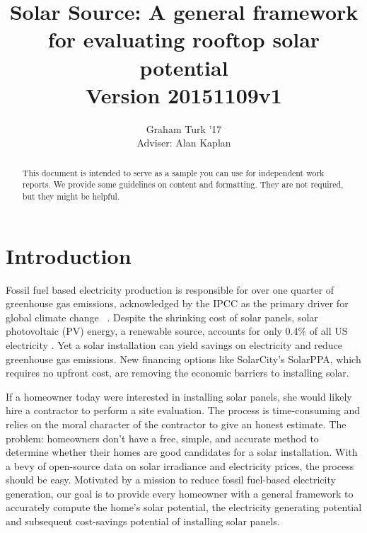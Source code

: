 \documentclass[pageno]{jpaper}
\begin{document}
\title{
Solar Source: A general framework for evaluating rooftop solar potential\\
Version 20151109v1}

\author{Graham Turk '17\\Adviser: Alan Kaplan}

\date{}
\maketitle

\thispagestyle{empty}
\doublespacing
\begin{abstract}
This document is intended to serve as a sample you can use for independent work reports.  We provide some guidelines on content and formatting.  They are not required, but they might be helpful.
\end{abstract}


\section{Introduction}  
Fossil fuel based electricity production is responsible for over one quarter of greenhouse gas emissions, acknowledged by the IPCC as the primary driver for global climate change ~\cite{IPCC}. Despite the shrinking cost of solar panels, solar photovoltaic (PV) energy, a renewable source, accounts for only 0.4\% of all US electricity \cite{USEIA}. Yet a solar installation can yield savings on electricity and reduce greenhouse gas emissions. New financing options like SolarCity's SolarPPA, which requires no upfront cost, are removing the economic barriers to installing solar.

If a homeowner today were interested in installing solar panels, she would likely hire a contractor to perform a site evaluation. The process is time-consuming and relies on the moral character of the contractor to give an honest estimate. The problem: homeowners don't have a free, simple, and accurate method to determine whether their homes are good candidates for a solar installation. With a bevy of open-source data on solar irradiance and electricity prices, the process should be easy. Motivated by a mission to reduce fossil fuel-based electricity generation, our goal is to provide every homeowner with a general framework to accurately compute the home's solar potential, the electricity generating potential and subsequent cost-savings potential of installing solar panels.
\end{document}
